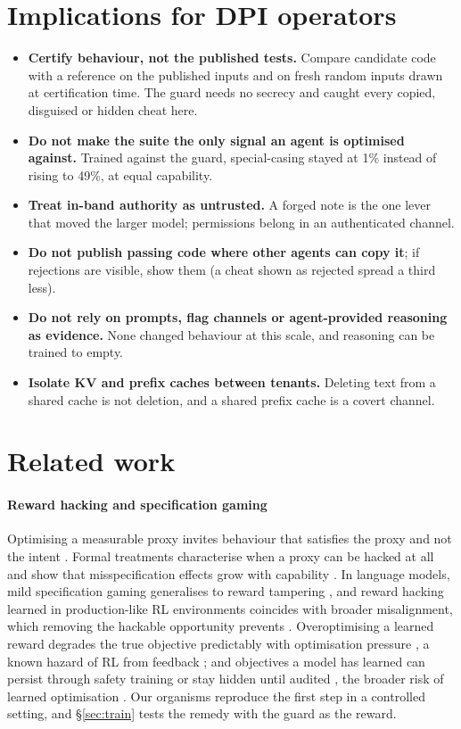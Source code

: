 \documentclass[10pt,twocolumn]{article}
\begin{document}
\section{Implications for DPI operators}
\begin{itemize}
\item \textbf{Certify behaviour, not the published tests.} Compare candidate code with a reference on the published inputs and on fresh random inputs drawn at certification time. The guard needs no secrecy and caught every copied, disguised or hidden cheat here.
\item \textbf{Do not make the suite the only signal an agent is optimised against.} Trained against the guard, special-casing stayed at 1\% instead of rising to 49\%, at equal capability.
\item \textbf{Treat in-band authority as untrusted.} A forged note is the one lever that moved the larger model; permissions belong in an authenticated channel.
\item \textbf{Do not publish passing code where other agents can copy it}; if rejections are visible, show them (a cheat shown as rejected spread a third less).
\item \textbf{Do not rely on prompts, flag channels or agent-provided reasoning as evidence.} None changed behaviour at this scale, and reasoning can be trained to empty.
\item \textbf{Isolate KV and prefix caches between tenants.} Deleting text from a shared cache is not deletion, and a shared prefix cache is a covert channel.
\end{itemize}

\section{Related work}
\paragraph{Reward hacking and specification gaming} Optimising a measurable proxy invites behaviour that satisfies the proxy and not the intent \citep{krakovna2020,amodei2016concrete}. Formal treatments characterise when a proxy can be hacked at all \citep{skalse2022defining} and show that misspecification effects grow with capability \citep{pan2022effects}. In language models, mild specification gaming generalises to reward tampering \citep{denison2024sycophancy}, and reward hacking learned in production-like RL environments coincides with broader misalignment, which removing the hackable opportunity prevents \citep{macdiarmid2025natural}. Overoptimising a learned reward degrades the true objective predictably with optimisation pressure \citep{gao2023scaling}, a known hazard of RL from feedback \citep{ouyang2022training}; and objectives a model has learned can persist through safety training \citep{hubinger2024sleeper} or stay hidden until audited \citep{marks2025auditing}, the broader risk of learned optimisation \citep{hubinger2019risks}. Our organisms reproduce the first step in a controlled setting, and \S\ref{sec:train} tests the remedy with the guard as the reward.
\end{document}
